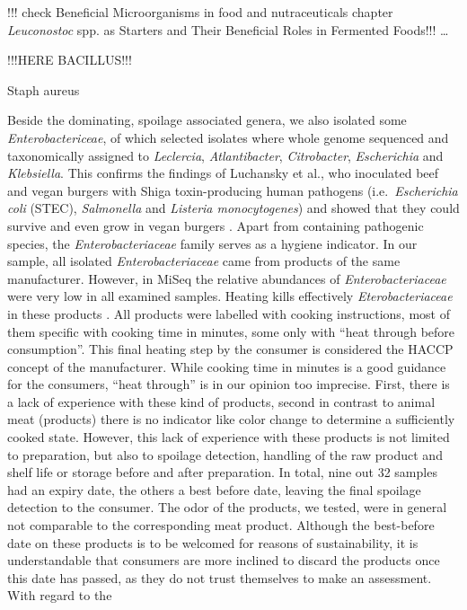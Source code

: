 \documentclass[preprint, 3p,
authoryear]{elsarticle} %
\begin{document}
!!! check Beneficial Microorganisms in food and nutraceuticals chapter
\emph{Leuconostoc} spp. as Starters and Their Beneficial Roles in
Fermented Foods!!! \ldots{}

!!!HERE BACILLUS!!!

Staph aureus

Beside the dominating, spoilage associated genera, we also isolated some
\emph{Enterobactericeae}, of which selected isolates where whole genome
sequenced and taxonomically assigned to \emph{Leclercia},
\emph{Atlantibacter}, \emph{Citrobacter}, \emph{Escherichia} and
\emph{Klebsiella}. This confirms the findings of Luchansky et al., who
inoculated beef and vegan burgers with Shiga toxin-producing human
pathogens (i.e.~\emph{Escherichia coli} (STEC), \emph{Salmonella} and
\emph{Listeria monocytogenes}) and showed that they could survive and
even grow in vegan burgers \citep{Luchansky.2020}. Apart from containing
pathogenic species, the \emph{Enterobacteriaceae} family serves as a
hygiene indicator. In our sample, all isolated \emph{Enterobacteriaceae}
came from products of the same manufacturer. However, in MiSeq the
relative abundances of \emph{Enterobacteriaceae} were very low in all
examined samples. Heating kills effectively \emph{Eterobacteriaceae} in
these products \citep{Luchansky.2020}. All products were labelled with
cooking instructions, most of them specific with cooking time in
minutes, some only with ``heat through before consumption''. This final
heating step by the consumer is considered the HACCP concept of the
manufacturer. While cooking time in minutes is a good guidance for the
consumers, ``heat through'' is in our opinion too imprecise. First,
there is a lack of experience with these kind of products, second in
contrast to animal meat (products) there is no indicator like color
change to determine a sufficiently cooked state. However, this lack of
experience with these products is not limited to preparation, but also
to spoilage detection, handling of the raw product and shelf life or
storage before and after preparation. In total, nine out 32 samples had
an expiry date, the others a best before date, leaving the final
spoilage detection to the consumer. The odor of the products, we tested,
were in general not comparable to the corresponding meat product.
Although the best-before date on these products is to be welcomed for
reasons of sustainability, it is understandable that consumers are more
inclined to discard the products once this date has passed, as they do
not trust themselves to make an assessment. With regard to the
\end{document}
